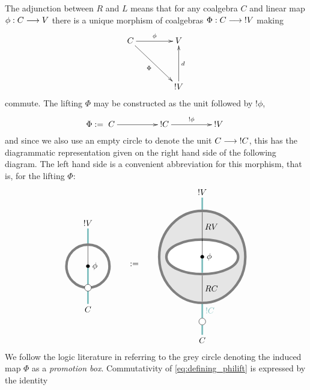 \documentclass[english,letter paper,12pt,reqno]{article}
\def\drawbang{\draw[color=teal!50, line width=2pt]}
\def\drawprom{\draw[color=gray, line width=3pt]}
\def\mapnode{\node[circle,draw=black,fill=black,inner sep=0.5mm]}
\def\dernode{\node[circle,draw=black,fill=white]}
\theoremstyle{example}
\begin{document}
The adjunction between $R$ and $L$ means that for any coalgebra $C$ and linear map $\phi: C \longrightarrow V$ there is a unique morphism of coalgebras $\Phi : C \longrightarrow {!}V$ making
\begin{equation}\label{eq:defining_philift}
\xymatrix@C+1.5pc@R+1.5pc{
C \ar[r]^-{\phi}\ar[dr]_-{\Phi} & V\\
& {!}V \ar[u]_-{d}
}
\end{equation}
commute. The lifting $\Phi$ may be constructed as the unit followed by ${!} \phi$,
\[
\Phi := \xymatrix@C+2pc{ C \ar[r] & {!} C \ar[r]^-{{!} \phi} & {!} V}
\]
and since we also use an empty circle to denote the unit $C \longrightarrow {!} C$, this has the diagrammatic representation given on the right hand side of the following diagram. The left hand side is a convenient abbreviation for this morphism, that is, for the lifting $\Phi$:
\begin{equation}\label{eq:abbrev_for_prom}
\begin{tikzpicture}[scale=0.6,auto,inner sep=1mm, baseline=(current  bounding  box.center)]
\node (top) at (0,3) {$!V$};
\node (bottom) at (0,-3) {$C$};
\mapnode (o) at (0,0) {};
\node [right] at (o.east) {$\phi$};
\draw (o) to (0,2);
\drawbang (bottom) -- (0,-1.5);
\drawbang (0,1.5) -- (top);
\drawbang (0,-1.5) -- (o);
\drawprom (0,0) ellipse (1.5cm and 1.5cm);
\dernode (bottom) at (0,-1.5) {};
\end{tikzpicture}
\qquad := \qquad
\begin{tikzpicture}[scale=0.6,auto,inner sep=1mm,baseline=(current  bounding  box.center)]
\node (vtop) at (0,4.5) {${!} V$};
\node (bottom) at (0,-5.8) {$C$};
\coordinate (top_c) at (0,3);
\coordinate (bottom_c) at (0,-3.2);
\drawbang (top_c) to (vtop);
\dernode (bottomd) at (0,-4.5) {};
\drawbang (bottomd) to node [swap] {${!} C$} (bottom_c);
\drawbang (bottom) to (bottomd);
\draw[color=gray, line width=3pt, fill=gray!20] (0,0) ellipse (3cm and 3.2cm);
\draw[color=gray, line width=3pt, fill=white] (0,0) ellipse (2.5cm and 1.2cm);
\mapnode (o) at (0,0) {};
\node [right] at (o.east) {$\phi$};
\draw (o) to (0,1.2);
\drawbang (o) to (0,-1.1);
\draw (0,1.1) to node [swap] {$RV$} (0,3.1);
\draw (0,-3.1) to node [swap] {$RC$} (0,-1.3);
\end{tikzpicture}
\end{equation}
We follow the logic literature in referring to the grey circle denoting the induced map $\Phi$ as a \emph{promotion box}. Commutativity of \eqref{eq:defining_philift} is expressed by the identity
\end{document}
